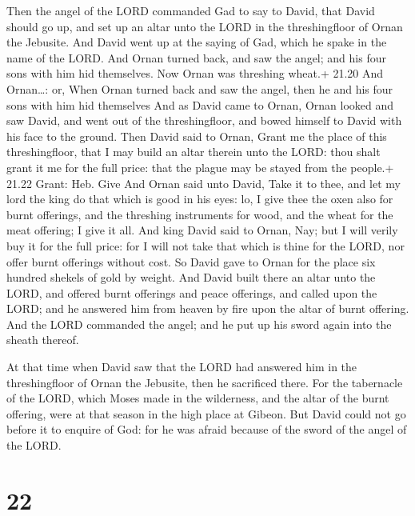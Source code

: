  Then the angel of the LORD commanded Gad to say to
David, that David should go up, and set up an altar unto the LORD in the
threshingfloor of Ornan the Jebusite.  And David went up at
the saying of Gad, which he spake in the name of the LORD. 
And Ornan turned back, and saw the angel; and his four sons with him hid
themselves. Now Ornan was threshing wheat.+ 21.20 And Ornan\ldots: or,
When Ornan turned back and saw the angel, then he and his four sons with
him hid themselves  And as David came to Ornan, Ornan
looked and saw David, and went out of the threshingfloor, and bowed
himself to David with his face to the ground.  Then David
said to Ornan, Grant me the place of this threshingfloor, that I may
build an altar therein unto the LORD: thou shalt grant it me for the
full price: that the plague may be stayed from the people.+ 21.22 Grant:
Heb. Give  And Ornan said unto David, Take it to thee, and
let my lord the king do that which is good in his eyes: lo, I give thee
the oxen also for burnt offerings, and the threshing instruments for
wood, and the wheat for the meat offering; I give it all. 
And king David said to Ornan, Nay; but I will verily buy it for the full
price: for I will not take that which is thine for the LORD, nor offer
burnt offerings without cost.  So David gave to Ornan for
the place six hundred shekels of gold by weight.  And David
built there an altar unto the LORD, and offered burnt offerings and
peace offerings, and called upon the LORD; and he answered him from
heaven by fire upon the altar of burnt offering.  And the
LORD commanded the angel; and he put up his sword again into the sheath
thereof.

 At that time when David saw that the LORD had answered
him in the threshingfloor of Ornan the Jebusite, then he sacrificed
there.  For the tabernacle of the LORD, which Moses made in
the wilderness, and the altar of the burnt offering, were at that season
in the high place at Gibeon.  But David could not go before
it to enquire of God: for he was afraid because of the sword of the
angel of the LORD.

\hypertarget{section-21}{%
\section{22}\label{section-21}}


